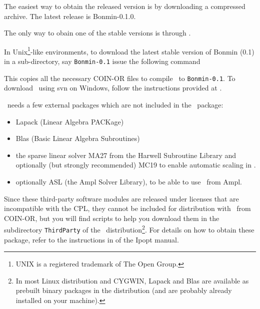 The easiest way to obtain the released version is by downloading a compressed archive. The latest release is Bonmin-0.1.0.

The only way to obain one of the stable versions is through .

In Unix\footnote{UNIX is a registered trademark of The Open
Group.}-like environments, to download the latest stable version of Bonmin (0.1) in a sub-directory, say {\tt Bonmin-0.1} 
issue the following command
\break

\begin{colorverb}
\end{colorverb}

\noindent This copies all the necessary COIN-OR files to compile \Bonmin\ to
{\tt Bonmin-0.1}. To download \Bonmin\ using svn on Windows,
follow the instructions provided at
.

\Bonmin\ needs a few external packages which are not included in the \Bonmin\ package:
\begin{itemize}
\item Lapack (Linear Algebra PACKage)
\item Blas (Basic Linear Algebra Subroutines)
\item the sparse linear solver MA27 from the Harwell Subroutine Library and optionally (but strongly recommended) MC19 to enable automatic scaling in \Ipopt.
\item optionally ASL (the Ampl Solver Library), to be able to use \Bonmin\ from Ampl.
\end{itemize}

Since these third-party software modules are released under licenses
that are incompatible with the CPL, they cannot be included for
distribution with \Bonmin\ from COIN-OR, but you will find scripts
to help you download them in the subdirectory {\tt ThirdParty} of
the \Bonmin\ distribution\footnote{In most Linux distribution and
CYGWIN, Lapack and Blas are available as prebuilt binary packages in
the distribution (and are probably already installed on your
machine).}. For details on how to obtain these package, refer to the
instructions in
 of the Ipopt manual.\\

